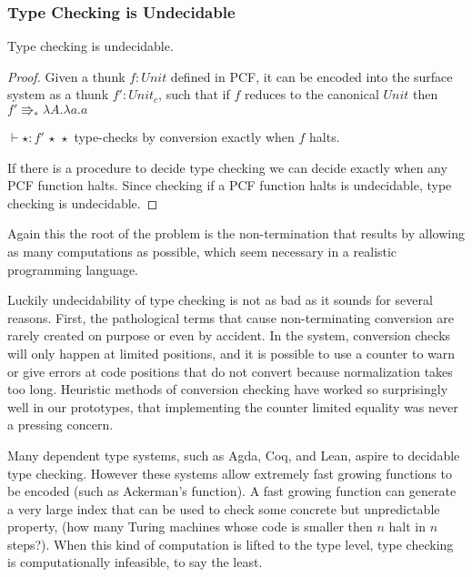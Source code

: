 \subsubsection{Type Checking is Undecidable}

\begin{thm} Type checking is undecidable.
\end{thm}
\begin{proof}
Given a thunk $f:Unit$ defined in PCF, it can be encoded into the surface system as a thunk $f':Unit_{c}$, such that if $f$ reduces to the canonical $Unit$ then $f'\Rrightarrow_{\ast}\lambda A.\lambda a.a$
 
$\vdash\star:f'\,\star\,\star$ type-checks by conversion exactly when $f$ halts.
 
If there is a procedure to decide type checking we can decide exactly when any PCF function halts.
Since checking if a PCF function halts is undecidable, type checking is undecidable.
 
\end{proof}
 
Again this the root of the problem is the non-termination that results by allowing as many computations as possible, which seem necessary in a realistic programming language.
 
Luckily undecidability of type checking is not as bad as it sounds for several reasons.
First, the pathological terms that cause non-terminating conversion are rarely created on purpose or even by accident.
In the \bidir{} system, conversion checks will only happen at limited positions, and it is possible to use a counter to warn or give errors at code positions that do not convert because normalization takes too long.
Heuristic methods of conversion checking have worked so surprisingly well in our prototypes, that implementing the counter limited equality was never a pressing concern.
 
Many dependent type systems, such as Agda, Coq, and Lean, aspire to decidable type checking.
However these systems allow extremely fast growing functions to be encoded (such as Ackerman's function).
A fast growing function can generate a very large index that can be used to check some concrete but unpredictable property, (how many Turing machines whose code is smaller then $n$ halt in $n$ steps?).
When this kind of computation is lifted to the type level, type checking is computationally infeasible, to say the least.
 
